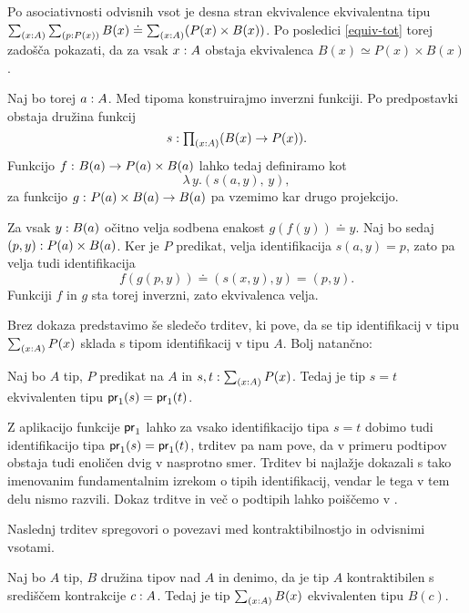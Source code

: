 \begin{dokaz}
  Po asociativnosti odvisnih vsot je desna stran ekvivalence ekvivalentna tipu
  \(\textstyle \sum_{\left( x : A \right)} \textstyle \sum_{\left( p : P(x) \right)} B(x) \doteq \textstyle \sum_{\left( x : A \right)} (P(x) \times B(x))\).
  Po posledici \ref{equiv-tot} torej zadošča pokazati, da za vsak \(x : A\)
  obstaja ekvivalenca \(B(x) \simeq P(x) \times B(x)\).

  Naj bo torej \(a : A\). Med tipoma konstruirajmo inverzni funkciji. Po predpostavki obstaja družina funkcij
  \[s : \textstyle \prod_{\left( x : A \right)} (B(x) \to P(x)).\]
  Funkcijo \(f \,\colon B(a) \to P(a) \times B(a)\) lahko tedaj definiramo kot
  \[\lambda \, y. \left(s(a,y),\, y\right),\] za funkcijo \(g \,\colon P(a) \times B(a) \to B(a)\) pa
  vzemimo kar drugo projekcijo.

  Za vsak \(y : B(a)\) očitno velja sodbena enakost \(g(f(y)) \doteq y\). Naj bo sedaj \((p, y) : P(a) \times B(a)\). Ker je \(P\)
  predikat, velja identifikacija \(s(a, y) = p\), zato pa velja tudi identifikacija
  \[f(g\left(p, y\right)) \doteq \left(s(x, y), y\right) = \left(p, y\right).\]
  Funkciji \(f\) in \(g\) sta torej inverzni, zato ekvivalenca velja.
\end{dokaz}

Brez dokaza predstavimo še sledečo trditev, ki pove, da se tip identifikacij v tipu \(\textstyle \sum_{\left( x : A \right)} P(x)\) sklada s tipom identifikacij v tipu \(A\). Bolj natančno:

\begin{trditev}
  \label{subtype-id}
  Naj bo \(A\) tip, \(P\) predikat na \(A\) in
  \(s, t : \textstyle \sum_{\left( x : A \right)} P(x)\). Tedaj je tip \(s = t\) ekvivalenten tipu \(\textnormal{\textsf{pr}}_{1}(s) = \textnormal{\textsf{pr}}_{1}(t)\).
\end{trditev}
Z aplikacijo funkcije \(\textnormal{\textsf{pr}}_{1}\) lahko za vsako identifikacijo tipa \(s = t\) dobimo tudi identifikacijo tipa \(\textnormal{\textsf{pr}}_{1}(s) = \textnormal{\textsf{pr}}_{1}(t)\), trditev pa nam pove, da v primeru podtipov obstaja tudi enoličen dvig v nasprotno smer.
Trditev bi najlažje dokazali s tako imenovanim fundamentalnim izrekom o tipih identifikacij, vendar le tega v tem delu nismo razvili. Dokaz trditve in več o podtipih lahko poiščemo v \cite[Poglavje II.12.2]{rijke2022introduction}.

Naslednj trditev spregovori o povezavi med kontraktibilnostjo in odvisnimi vsotami.

\begin{trditev}
  \label{sigma-contr-base}
  Naj bo \(A\) tip, \(B\) družina tipov nad \(A\) in denimo, da je tip \(A\) kontraktibilen s središčem kontrakcije \(c : A\). Tedaj je tip \(\textstyle \sum_{\left( x : A \right)} B(x)\) ekvivalenten tipu \(B(c)\).
\end{trditev}

